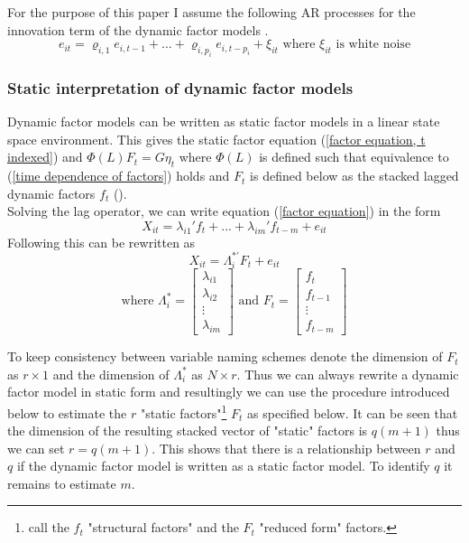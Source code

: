 \documentclass[11pt]{article}
\begin{document}
For the purpose of this paper I assume the following AR processes for the innovation term of the dynamic factor models \citep{breitung2011testing}.
\begin{equation}
	\label{AR process innovation term}
	e_{it} = \varrho_{i,1} e_{i, t-1} + ... + \varrho_{i, p_i} e_{i, t-p_i} + \xi_{it} \text{ where $\xi_{it}$ is white noise}
\end{equation}


\subsubsection{Static interpretation of dynamic factor models}
Dynamic factor models can be written as static factor models in a linear state space environment. This gives the static factor equation (\ref{factor equation, t indexed}) and $\Phi(L) F_t = G \eta_t$ where $\Phi(L)$ is defined such that equivalence to (\ref{time dependence of factors}) holds and $F_t$ is defined below as the stacked lagged dynamic factors $f_t$ (\citet{stock2011dynamic}). \\

Solving the lag operator, we can write equation (\ref{factor equation}) in the form 
\begin{equation}
	\label{factor equation, solved lag polynomial}
	X_{it} = \lambda_{i1}' f_t + ... + \lambda_{im}' f_{t-m} + e_{it}
\end{equation}
Following \citet{bai2002determining} this can be rewritten as 
$$X_{it} = \Lambda_i^{*'} F_t + e_{it}$$
$$\text{where } \Lambda_i^* = \begin{bmatrix} \lambda_{i1} \\ \lambda_{i2} \\ \vdots \\ \lambda_{im} \end{bmatrix} \text{ and } F_t = \begin{bmatrix} f_t \\ f_{t-1} \\ \vdots \\ f_{t-m} \end{bmatrix}$$

To keep consistency between variable naming schemes denote the dimension of $F_t$ as $r \times 1$ and the dimension of $\Lambda_i^*$ as $N \times r$. Thus we can always rewrite a dynamic factor model in static form and resultingly we can use the procedure introduced below to estimate the $r$ "static factors"\footnote{\citet{breitung2004identification} call the $f_t$ "structural factors" and the $F_t$ "reduced form" factors.} $F_t$ as specified below.
It can be seen that the dimension of the resulting stacked vector of "static" factors is $q(m+1)$ thus we can set $r=q(m+1)$. This shows that there is a relationship between $r$ and $q$ if the dynamic factor model is written as a static factor model. To identify $q$ it remains to estimate $m$.
\end{document}
